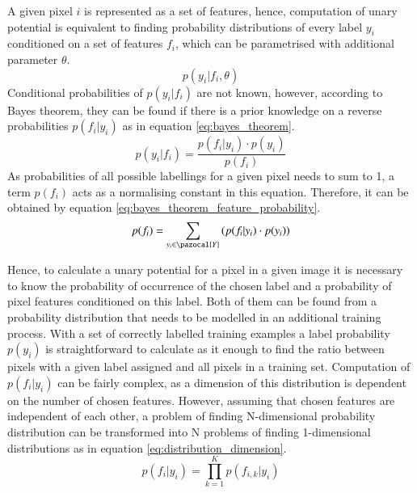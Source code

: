 A given pixel $i$ is represented as a set of features, hence, computation of unary potential is equivalent to finding probability distributions of every label $y_i$ conditioned on a set of features $f_i$, which can be parametrised with additional parameter $\theta$. 
\begin{equation}
p(y_i | f_i, \theta)
\end{equation}
Conditional probabilities of $p(y_i | f_i)$ are not known, however, according to Bayes theorem, they can be found if there is a prior knowledge on a reverse probabilities $p(f_i | y_i)$ as in equation \ref{eq:bayes_theorem}.
\begin{equation}
    \label{eq:bayes_theorem}
    p(y_i | f_i) = \frac{p(f_i | y_i) \cdot p(y_i)}{p(f_i)}
\end{equation}
As probabilities of all possible labellings for a given pixel needs to sum to 1, a term $p(f_i)$ acts as a normalising constant in this equation. Therefore, it can be obtained by equation \ref{eq:bayes_theorem_feature_probability}.
\begin{equation}
    \label{eq:bayes_theorem_feature_probability}
    p(f_i) = \sum_{y_i \in \pazocal{Y}}{(p(f_i | y_i) \cdot p(y_i))} 
\end{equation}

Hence, to calculate a unary potential for a pixel in a given image it is necessary to know the probability of occurrence of the chosen label and a probability of pixel features conditioned on this label. Both of them can be found from a probability distribution that needs to be modelled in an additional training process. With a set of correctly labelled training examples a label probability $p(y_i)$ is straightforward to calculate as it enough to find the ratio between pixels with a given label assigned and all pixels in a training set. Computation of $p(f_i | y_i)$ can be fairly complex, as a dimension of this distribution is dependent on the number of chosen features. However, assuming that chosen features are independent of each other, a problem of finding N-dimensional probability distribution can be transformed into N problems of finding 1-dimensional distributions as in equation \ref{eq:distribution_dimension}.
\begin{equation}
    \label{eq:distribution_dimension}
    p(f_i|y_i) = \prod_{k=1}^{K}p(f_{i,k}|y_i)
\end{equation}

